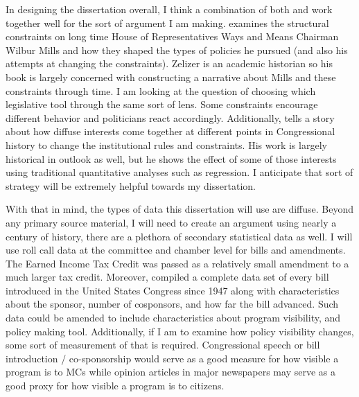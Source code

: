 \documentclass[12pt]{article}
\begin{document}
In designing the dissertation overall, I think a combination of both \cite{zelizer1998} and \cite{schickler2001} work together well for the sort of argument I am making. \cite{zelizer1998} examines the structural constraints on long time House of Representatives Ways and Means Chairman Wilbur Mills and how they shaped the types of policies he pursued (and also his attempts at changing the constraints). Zelizer is an academic historian so his book is largely concerned with constructing a narrative about Mills and these constraints through time. I am looking at the question of choosing which legislative tool through the same sort of lens. Some constraints encourage different behavior and politicians react accordingly. Additionally, \cite{schickler2001} tells a story about how diffuse interests come together at different points in Congressional history to change the institutional rules and constraints. His work is largely historical in outlook as well, but he shows the effect of some of those interests using traditional quantitative analyses such as regression. I anticipate that sort of strategy will be extremely helpful towards my dissertation.

With that in mind, the types of data this dissertation will use are diffuse. Beyond any primary source material, I will need to create an argument using nearly a century of history, there are a plethora of secondary statistical data as well. I will use roll call data at the committee and chamber level for bills and amendments. The Earned Income Tax Credit was passed as a relatively small amendment to a much larger tax credit. Moreover, \cite{adler2012} compiled a complete data set of every bill introduced in the United States Congress since 1947 along with characteristics about the sponsor, number of cosponsors, and how far the bill advanced. Such data could be amended to include characteristics about program visibility, and policy making tool. Additionally, if I am to examine how policy visibility changes, some sort of measurement of that is required. Congressional speech or bill introduction / co-sponsorship would serve as a good measure for how visible a program is to MCs while opinion articles in major newspapers may serve as a good proxy for how visible a program is to citizens. 

\end{document}
